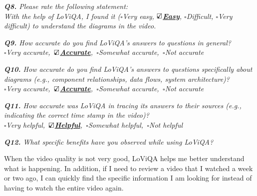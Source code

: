 \vspace*{1em}\noindent\textit{\textbf{Q8.} Please rate the following statement:
\\[.5em]
 \textit{With the help of LoViQA, I found it}
($\square$Very easy, \underline{\bfseries$\text{\rlap{$\checkmark$}}\square$Easy}, $\square$Difficult, $\square$Very difficult)
to understand the diagrams in the video.
}


\vspace*{1em}\noindent\textit{\textbf{Q9.} How accurate do you find LoViQA's answers to questions in general?
\\[.5em]
        \indent$\square$Very accurate,\,
        \underline{\bfseries$\text{\rlap{$\checkmark$}}\square$Accurate},\,
        $\square$Somewhat accurate,\,
        $\square$Not accurate
}



\vspace*{1em}\noindent\textit{\textbf{Q10.} How accurate do you find LoViQA's answers to questions specifically about diagrams (e.g., component relationships, data flows, system architecture)?
\\[.5em]
        \indent$\square$Very accurate,\,
        \underline{\bfseries$\text{\rlap{$\checkmark$}}\square$Accurate},\,
        $\square$Somewhat accurate,\,
        $\square$Not accurate
}



\vspace*{1em}\noindent\textit{\textbf{Q11.} 
How accurate was LoViQA in tracing its answers to their sources
(e.g.,  indicating the correct time stamp in the video)?
\\[.5em]
\indent $\square$Very helpful,\,
\underline{\bfseries$\text{\rlap{$\checkmark$}}\square$Helpful},\,
$\square$Somewhat helpful,\,
$\square$Not helpful
}


\vspace*{1em}\noindent\textit{\textbf{Q12.} What specific benefits have you observed while using LoViQA?
}
\begin{samepage}
\begin{mdframed}[style=MyFrame]
When the video quality is not very good, LoViQA helps me better understand what is happening. In addition, if I need to review a video that I watched a week or two ago, I can quickly find the specific information I am looking for instead of having to watch the entire video again.
\end{mdframed}
\end{samepage}

